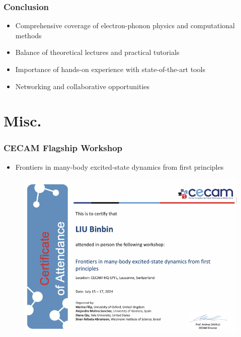 \documentclass{CustomBeamer}
\begin{document}
 

    \begin{frame}
        \frametitle{Conclusion}
        \begin{itemize}
            \item Comprehensive coverage of electron-phonon physics and computational methods
            \item Balance of theoretical lectures and practical tutorials
            \item Importance of hands-on experience with state-of-the-art tools
            \item Networking and collaborative opportunities
        \end{itemize}
        \end{frame}

        

    \section*{Misc.}

    \begin{frame}
        \frametitle{CECAM Flagship Workshop}
        \begin{itemize}
        \item      Frontiers in many-body excited-state dynamics from first principles
        \end{itemize}
    \begin{figure}
        \centering
        \includegraphics[width=0.6\linewidth]{cecam.png}
    \end{figure}
    \end{frame}
\end{document}
